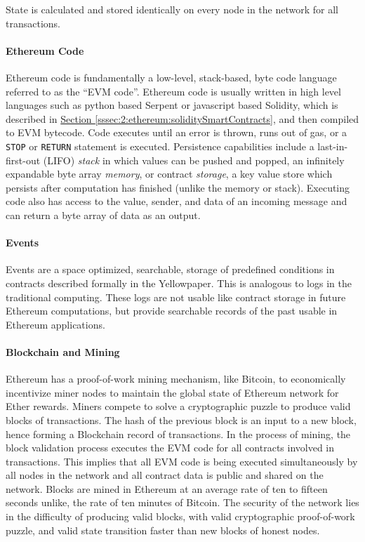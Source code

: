 \documentclass[a4paper,12pt]{article} %
\newcommand{\hypersectionref}[1]{\hyperref[#1]{Section \ref{#1}}}
\def\code#1{\texttt{#1}}
\begin{document}
State is calculated and stored identically on every node in the network for all transactions.

\paragraph*{Ethereum Code}

Ethereum code is fundamentally a low-level, stack-based, byte code language referred to as the ``EVM code''. Ethereum code is usually written in high level languages such as python based Serpent\cite{serpent} or javascript based Solidity, which is described in \hypersectionref{sssec:2:ethereum:soliditySmartContracts}, and then compiled to EVM bytecode. Code executes until an error is thrown, runs out of gas, or a \code{STOP} or \code{RETURN} statement is executed. Persistence capabilities include a last-in-first-out (LIFO) \textit{stack} in which values can be pushed and popped, an infinitely expandable byte array \textit{memory}, or contract \textit{storage}, a key value store which persists after computation has finished (unlike the memory or stack). Executing code also has access to the value, sender, and data of an incoming message and can return a byte array of data as an output.

\paragraph*{Events}
Events are a space optimized, searchable, storage of predefined conditions in contracts described formally in the Yellowpaper\cite{yellowpaper}. This is analogous to logs in the traditional computing. These logs are not usable like contract storage in future Ethereum computations, but provide searchable records of the past usable in Ethereum applications.

\paragraph*{Blockchain and Mining}

Ethereum has a proof-of-work mining mechanism, like Bitcoin, to economically incentivize miner nodes to maintain the global state of Ethereum network for Ether rewards. Miners compete to solve a cryptographic puzzle to produce valid blocks of transactions. The hash of the previous block is an input to a new block, hence forming a Blockchain record of transactions. In the process of mining, the block validation process executes the EVM code for all contracts involved in transactions. This implies that all EVM code is being executed simultaneously by all nodes in the network and all contract data is public and shared on the network. Blocks are mined in Ethereum at an average rate of ten to fifteen seconds unlike, the rate of ten minutes of Bitcoin. The security of the network lies in the difficulty of producing valid blocks, with valid cryptographic proof-of-work puzzle, and valid state transition faster than new blocks of honest nodes.
\end{document}
